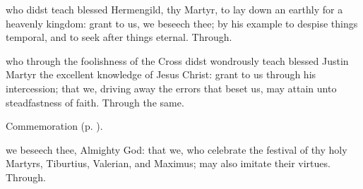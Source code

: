 

\memorialCollect
{} who didst teach blessed Hermengild, thy Martyr, to lay down an earthly for a heavenly kingdom: grant to us, we beseech thee; by his example to despise things temporal, and to seek after things eternal. Through.



\memorialCollect
{} who through the foolishness of the Cross didst wondrously teach blessed Justin Martyr the excellent knowledge of Jesus Christ: grant to us through his intercession; that we, driving away the errors that beset us, may attain unto steadfastness of faith. Through the same.

\begin{rubric}
	Commemoration  (p. \pageref{TiburtiusCollect}).
\end{rubric}


\clearpage
{}



\memorialCollect\label{TiburtiusCollect}
 we beseech thee, Almighty God: that we, who celebrate the festival of thy holy Martyrs, Tiburtius, Valerian, and Maximus; may also imitate their virtues. Through.



